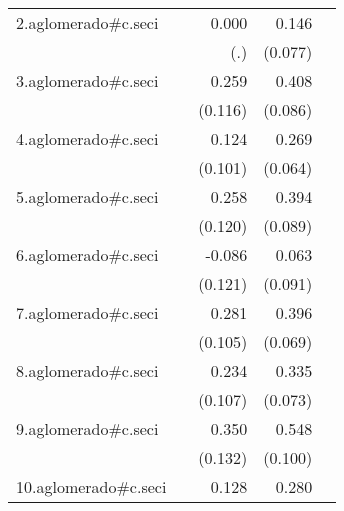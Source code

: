 {\begin{longtable}{l*{4}{D{.}{.}{-1}}}
\addlinespace
2.aglomerado#c.seci&                     &       0.000         &       0.146         &                     \\
            &                     &         (.)         &     (0.077)         &                     \\
\addlinespace
3.aglomerado#c.seci&                     &       0.259\sym{*}  &       0.408\sym{***}&                     \\
            &                     &     (0.116)         &     (0.086)         &                     \\
\addlinespace
4.aglomerado#c.seci&                     &       0.124         &       0.269\sym{***}&                     \\
            &                     &     (0.101)         &     (0.064)         &                     \\
\addlinespace
5.aglomerado#c.seci&                     &       0.258\sym{*}  &       0.394\sym{***}&                     \\
            &                     &     (0.120)         &     (0.089)         &                     \\
\addlinespace
6.aglomerado#c.seci&                     &      -0.086         &       0.063         &                     \\
            &                     &     (0.121)         &     (0.091)         &                     \\
\addlinespace
7.aglomerado#c.seci&                     &       0.281\sym{**} &       0.396\sym{***}&                     \\
            &                     &     (0.105)         &     (0.069)         &                     \\
\addlinespace
8.aglomerado#c.seci&                     &       0.234\sym{*}  &       0.335\sym{***}&                     \\
            &                     &     (0.107)         &     (0.073)         &                     \\
\addlinespace
9.aglomerado#c.seci&                     &       0.350\sym{**} &       0.548\sym{***}&                     \\
            &                     &     (0.132)         &     (0.100)         &                     \\
\addlinespace
10.aglomerado#c.seci&                     &       0.128         &       0.280\sym{***}&                     \\

\end{longtable}}
